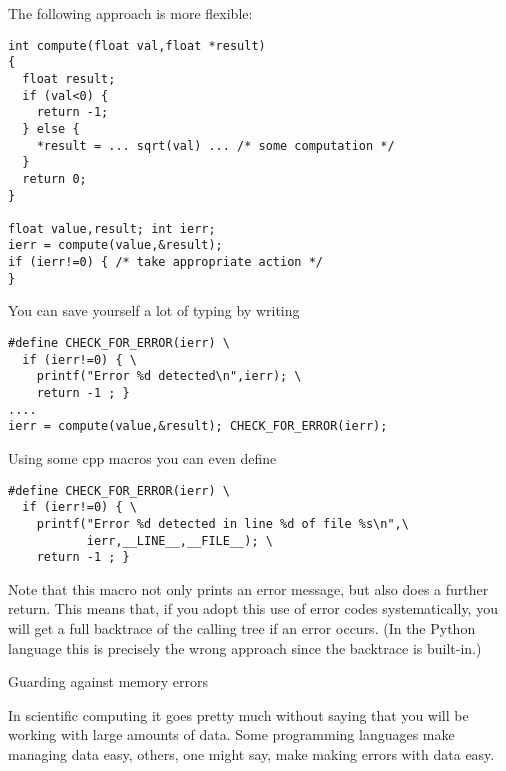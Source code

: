 The following approach is more flexible:
\begin{verbatim}
int compute(float val,float *result)
{
  float result;
  if (val<0) {
    return -1;
  } else {
    *result = ... sqrt(val) ... /* some computation */
  }
  return 0;
}

float value,result; int ierr;
ierr = compute(value,&result);
if (ierr!=0) { /* take appropriate action */
}
\end{verbatim}
You can save yourself a lot of typing by writing
\begin{verbatim}
#define CHECK_FOR_ERROR(ierr) \
  if (ierr!=0) { \
    printf("Error %d detected\n",ierr); \
    return -1 ; }
....
ierr = compute(value,&result); CHECK_FOR_ERROR(ierr);
\end{verbatim}
Using some cpp macros you can even define
\begin{verbatim}
#define CHECK_FOR_ERROR(ierr) \
  if (ierr!=0) { \
    printf("Error %d detected in line %d of file %s\n",\
           ierr,__LINE__,__FILE__); \
    return -1 ; }
\end{verbatim}
Note that this macro not only prints an error message, but also does a
further return. This means that, if you adopt this use of error codes
systematically, you will get a full backtrace of the calling tree if
an error occurs. (In the Python language this is precisely the wrong
approach since the backtrace is built-in.)

\Level 0 {Guarding against memory errors}

In scientific computing it goes pretty much without saying that you
will be working with large amounts of data.
Some programming languages make managing data easy, others, one might
say, make making errors with data easy. 

